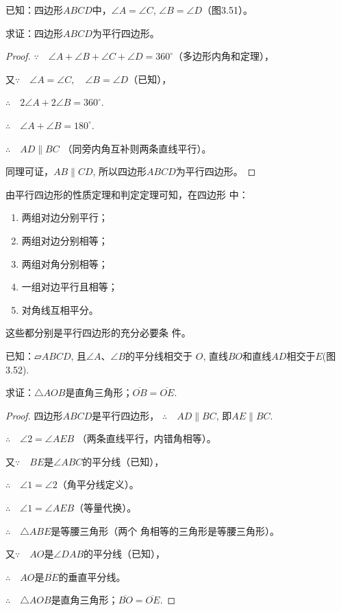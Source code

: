已知：四边形$ABCD$中，$\angle A=\angle C$, $\angle B=\angle D$（图3.51）。

求证：四边形$ABCD$为平行四边形。

\begin{proof}
$\because\quad \angle A+\angle B+\angle C +\angle D=360^{\circ}$（多边形内角和定理），

又$\because\quad \angle A=\angle C,\quad\angle B=\angle D$（已知），

$\therefore\quad 2\angle A+2\angle B=360^{\circ}$.

$\therefore\quad \angle A+\angle B=180^{\circ}$.

$\therefore\quad AD\parallel BC$ （同旁内角互补则两条直线平行）。

同理可证，$AB\parallel CD$, 所以四边形$ABCD$为平行四边形。
\end{proof}

由平行四边形的性质定理和判定定理可知，在四边形
中：
\begin{enumerate}
    \item 两组对边分别平行；
    \item 两组对边分别相等；
    \item 两组对角分别相等；
    \item 一组对边平行且相等；
    \item 对角线互相平分。
\end{enumerate}
这些都分别是平行四边形的充分必要条
件。

\begin{example}
     已知：$\parallelogram ABCD$, 且$\angle A$、$\angle B$的平分线相交于
$O$, 直线$BO$和直线$AD$相交于$E$(图3.52).

求证：$\triangle AOB$是直角三角形；$\overline{OB}=\overline{OE}$.
\end{example}

\begin{proof}
四边形$ABCD$是平行四边形，
$\therefore\quad AD\parallel BC$, 即$AE\parallel BC$.

$\therefore\quad \angle 2=\angle AEB$ （两条直线平行，内错角相等）。

又$\because\quad BE$是$\angle ABC$的平分线（已知），

$\therefore\quad \angle 1=\angle 2$（角平分线定义）。

$\therefore\quad \angle 1=\angle AEB$（等量代换）。

$\therefore\quad \triangle ABE$是等腰三角形（两个
角相等的三角形是等腰三角形）。

又$\because\quad AO$是$\angle DAB$的平分线（已知），

$\therefore\quad AO$是$\overline{BE}$的垂直平分线。

$\therefore\quad \triangle AOB$是直角三角形；$\overline{BO}=\overline{OE}$.
\end{proof}

